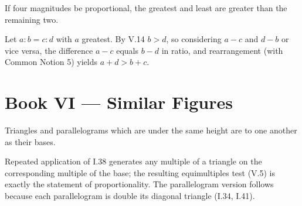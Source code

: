 \documentclass{rrxiv}
\begin{document}
\begin{claim}
\label{prop:V.25}
If four magnitudes be proportional, the greatest and least are greater
than the remaining two.
\end{claim}
\begin{evidence}[Proof of V.25]
\label{ev:V.25}
Let $a : b = c : d$ with $a$ greatest.  By V.14 $b > d$, so
considering $a - c$ and $d - b$ or vice versa, the difference $a - c$
equals $b - d$ in ratio, and rearrangement (with Common Notion 5)
yields $a + d > b + c$.
\end{evidence}
%
%

\section{Book VI --- Similar Figures}
\label{sec:book-VI}

\begin{claim}
\label{prop:VI.1}
Triangles and parallelograms which are under the same height are to
one another as their bases.
\end{claim}
\begin{evidence}[Proof of VI.1]
\label{ev:VI.1}
Repeated application of I.38 generates any multiple of a triangle on
the corresponding multiple of the base; the resulting equimultiples
test (V.5) is exactly the statement of proportionality.  The
parallelogram version follows because each parallelogram is double
its diagonal triangle (I.34, I.41).
\end{evidence}
\end{document}
